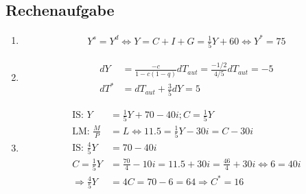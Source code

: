 \documentclass{scrartcl}
\begin{document}
\subsection{Rechenaufgabe}
\begin{enumerate}
  \item \begin{align*}
    Y^s=Y^d \Leftrightarrow Y = C + I + G = \frac{1}{5}Y + 60 \Leftrightarrow Y^* = 75
  \end{align*}
  \item \begin{align*}
    dY &= \frac{-c}{1-c(1-q)} dT_{aut} = \frac{-1/2}{4/5} dT_{aut} = -5\\
    dT^* &= dT_{aut} + \frac{3}{5}dY = 5
  \end{align*}
  \item \begin{align*}
    \text{IS: } Y &= \frac{1}{5}Y + 70 -40 i; C=\frac{1}{5}Y\\
    \text{LM: } \frac{M}{P} &= L \Leftrightarrow11.5 = \frac{1}{5}Y -30i = C-30i\\
    \text{IS: } \frac{4}{5} Y &= 70-40i\\
    C=\frac{1}{5}Y &= \frac{70}{4}-10i = 11.5 + 30i = \frac{46}{4}+30i \Leftrightarrow 6 = 40i\\
    \Rightarrow \frac{4}{5} Y &= 4 C = 70-6 = 64 \Rightarrow C^*=16
  \end{align*}
\end{enumerate}
\end{document}
